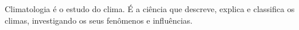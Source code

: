 \newpar Climatologia é o estudo do clima. É  a ciência que descreve, explica e classifica os climas, investigando os seus fenômenos e influências.